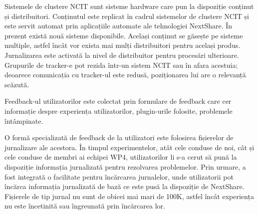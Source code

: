 Sistemele de clustere NCIT sunt sisteme hardware care pun la dispoziție
conținut și distribuitori. Conținutul este replicat în cadrul sistemelor de
clustere NCIT și este servit automat prin aplicațiile automate ale tehnologiei
NextShare. În prezent există nouă sisteme disponibile. Același conținut se
găsește pe sisteme multiple, astfel încât vor exista mai mulți distribuitori
pentru același produs. Jurnalizarea este activată la nivel de distribuitor
pentru procesări ulterioare. Grupurile de tracker-e pot rezida într-un sistem
NCIT sau în afara acestuia; deoarece comunicația cu tracker-ul este redusă,
poziționarea lui are o relevanță scăzută.

Feedback-ul utilizatorilor este colectat prin formulare de feedback care cer
informație despre experiența utilizatorilor, plugin-urile folosite,
problemele întâmpinate.

O formă specializată de feedback de la utilizatori este folosirea fișierelor
de jurnalizare ale acestora. În timpul experimentelor, atât cele conduse de
noi, cât și cele conduse de membri ai echipei WP4, utilizatorilor li s-a cerut
să pună la dispoziție informația jurnalizată pentru rezolvarea problemelor.
Prin urmare, a fost integrată o facilitate pentru încărcarea jurnalelor, unde
utilizatorii pot încărca informația jurnalizată de bază ce este pusă la
dispoziție de NextShare.  Fișierele de tip jurnal nu sunt de obicei mai mari de
100K, astfel încât experiența nu este încetinită sau îngreunată prin
încărcarea lor.

